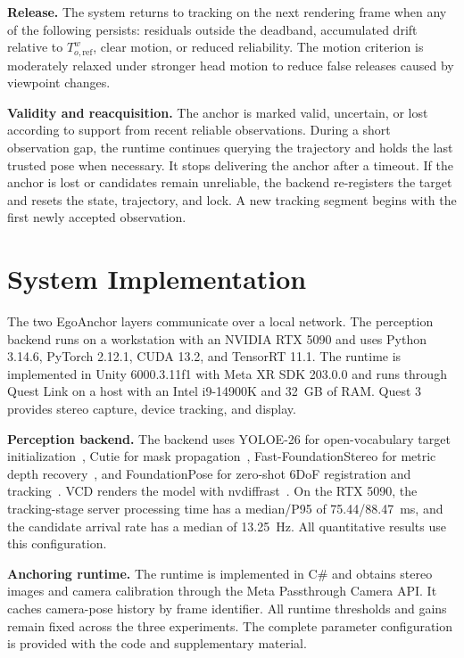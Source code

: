 \documentclass[review]{vgtc}
\begin{document}
\textbf{Release.} The system returns to tracking on the next rendering frame when any of the following persists: residuals outside the deadband, accumulated drift relative to $T_{o,\mathrm{ref}}^w$, clear motion, or reduced reliability. The motion criterion is moderately relaxed under stronger head motion to reduce false releases caused by viewpoint changes.

\textbf{Validity and reacquisition.}\label{sec:validity}
The anchor is marked valid, uncertain, or lost according to support from recent reliable observations. During a short observation gap, the runtime continues querying the trajectory and holds the last trusted pose when necessary. It stops delivering the anchor after a timeout. If the anchor is lost or candidates remain unreliable, the backend re-registers the target and resets the state, trajectory, and lock. A new tracking segment begins with the first newly accepted observation.

\section{System Implementation}\label{sec:implementation}

The two EgoAnchor layers communicate over a local network. The perception backend runs on a workstation with an NVIDIA RTX 5090 and uses Python 3.14.6, PyTorch 2.12.1, CUDA 13.2, and TensorRT 11.1. The runtime is implemented in Unity 6000.3.11f1 with Meta XR SDK 203.0.0 and runs through Quest Link on a host with an Intel i9-14900K and 32~GB of RAM. Quest 3 provides stereo capture, device tracking, and display.

\textbf{Perception backend.}
The backend uses YOLOE-26 for open-vocabulary target initialization~\cite{yoloe2025}, Cutie for mask propagation~\cite{cutie2024}, Fast-FoundationStereo for metric depth recovery~\cite{fastfoundationstereo2026}, and FoundationPose for zero-shot 6DoF registration and tracking~\cite{foundationpose2024}. VCD renders the model with nvdiffrast~\cite{nvdiffrast2020}. On the RTX 5090, the tracking-stage server processing time has a median/P95 of 75.44/88.47~ms, and the candidate arrival rate has a median of 13.25~Hz. All quantitative results use this configuration.

\textbf{Anchoring runtime.}
The runtime is implemented in C\# and obtains stereo images and camera calibration through the Meta Passthrough Camera API. It caches camera-pose history by frame identifier. All runtime thresholds and gains remain fixed across the three experiments. The complete parameter configuration is provided with the code and supplementary material.
\end{document}
